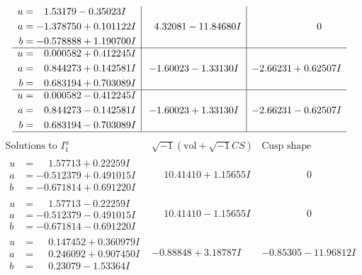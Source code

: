 \documentclass[1p]{elsarticle_modified}
\theoremstyle{definition}
\newcommand{\I}{\sqrt{-1}}
\begin{document}
$$\begin{array}{c|c|c}
\begin{aligned}
u &= \phantom{-}1.53179 - 0.35023 I \\
a &= -1.378750 + 0.101122 I \\
b &= -0.578888 + 1.190700 I\end{aligned}
 & \phantom{-}4.32081 - 11.84680 I & \phantom{-0.000000 } 0 \\ \hline\begin{aligned}
u &= \phantom{-}0.000582 + 0.412245 I \\
a &= \phantom{-}0.844273 + 0.142581 I \\
b &= \phantom{-}0.683194 + 0.703089 I\end{aligned}
 & -1.60023 - 1.33130 I & -2.66231 + 0.62507 I \\ \hline\begin{aligned}
u &= \phantom{-}0.000582 - 0.412245 I \\
a &= \phantom{-}0.844273 - 0.142581 I \\
b &= \phantom{-}0.683194 - 0.703089 I\end{aligned}
 & -1.60023 + 1.33130 I & -2.66231 - 0.62507 I\\
 \hline 
 \end{array}$$\newpage$$\begin{array}{c|c|c}  
\text{Solutions to }I^u_{1}& \I (\text{vol} + \sqrt{-1}CS) & \text{Cusp shape}\\
 \hline 
\begin{aligned}
u &= \phantom{-}1.57713 + 0.22259 I \\
a &= -0.512379 + 0.491015 I \\
b &= -0.671814 + 0.691220 I\end{aligned}
 & \phantom{-}10.41410 + 1.15655 I & \phantom{-0.000000 } 0 \\ \hline\begin{aligned}
u &= \phantom{-}1.57713 - 0.22259 I \\
a &= -0.512379 - 0.491015 I \\
b &= -0.671814 - 0.691220 I\end{aligned}
 & \phantom{-}10.41410 - 1.15655 I & \phantom{-0.000000 } 0 \\ \hline\begin{aligned}
u &= \phantom{-}0.147452 + 0.360979 I \\
a &= \phantom{-}0.246092 + 0.907450 I \\
b &= \phantom{-}0.23079 - 1.53364 I\end{aligned}
 & -0.88848 + 3.18787 I & -0.85305 - 11.96812 I \\ \hline\begin{aligned}

\end{aligned}
\end{array}$$
\end{document}
